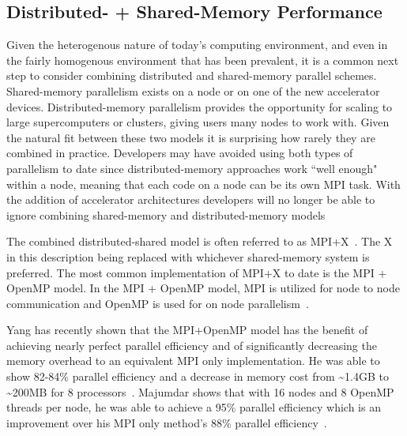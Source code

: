 \subsection*{ \textbf{Distributed- + Shared-Memory Performance}}

%
Given the heterogenous nature of today's computing environment, and even in the fairly homogenous environment that has been prevalent, it is a common next step to consider combining distributed and shared-memory parallel schemes.
%
Shared-memory parallelism exists on a node or on one of the new accelerator devices.
%
Distributed-memory parallelism provides the opportunity for scaling to large supercomputers or clusters, giving users many nodes to work with.
%
Given the natural fit between these two models it is surprising how rarely they are combined in practice.
%
Developers may have avoided using both types of parallelism to date since 
distributed-memory approaches work ``well enough" within a node, meaning
that each code on a node can be its own MPI task.
%
With the addition of accelerator architectures developers will no longer be able to ignore combining shared-memory and distributed-memory models
%

%
The combined distributed-shared model is often referred to as MPI+X~\cite{michaelwolfe2014}.
%
The X in this description being replaced with whichever shared-memory system is preferred.
%
The most common implementation of MPI+X to date is the MPI + OpenMP model.
%
In the MPI + OpenMP model, MPI is utilized for node to node communication and OpenMP is used for on node parallelism~\cite{michaelwolfe2014}.
%

%
Yang has recently shown that the MPI+OpenMP model has the benefit of achieving nearly perfect parallel efficiency and of significantly decreasing the memory overhead to an equivalent MPI only implementation.
%
He was able to show 82-84\% parallel efficiency and a decrease in memory cost from \textasciitilde1.4GB to \textasciitilde200MB for 8 processors~\cite{yanghybrid}.
%
Majumdar shows that with 16 nodes and 8 OpenMP threads per node, he was able to achieve a 95\% parallel efficiency which is an improvement over his MPI only method's 88\% parallel efficiency~\cite{majumdar2000parallel}. 
%
